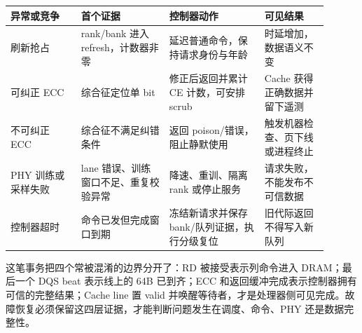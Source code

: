\begin{longtable}{L{0.20\linewidth}L{0.25\linewidth}L{0.27\linewidth}L{0.18\linewidth}}
\toprule
异常或竞争 & 首个证据 & 控制器动作 & 可见结果 \\
\midrule
刷新抢占 & rank/bank 进入 refresh，计数器非零 & 延迟普通命令，保持请求身份与年龄 & 时延增加，数据语义不变 \\\tablerowrule
可纠正 ECC & 综合征定位单 bit & 修正后返回并累计 CE 计数，可安排 scrub & Cache 获得正确数据并留下遥测 \\\tablerowrule
不可纠正 ECC & 综合征不满足纠错条件 & 返回 poison/错误，阻止静默使用 & 触发机器检查、页下线或进程终止 \\\tablerowrule
PHY 训练或采样失败 & lane 错误、训练窗口不足、重复校验异常 & 降速、重训、隔离 rank 或停止服务 & 请求失败，不能发布不可信数据 \\\tablerowrule
控制器超时 & 命令已发但完成窗口到期 & 冻结新请求并保存 bank/队列证据，执行分级复位 & 旧代际返回不得写入新队列 \\
\bottomrule
\end{longtable}

这笔事务把四个常被混淆的边界分开了：RD 被接受表示列命令进入 DRAM；最后一个 DQS beat 表示线上的 64B 已到齐；ECC 和返回缓冲完成表示控制器拥有可信的完整结果；Cache line 置 valid 并唤醒等待者，才是处理器侧可见完成。故障恢复必须保留这四层证据，才能判断问题发生在调度、命令、PHY 还是数据完整性。
